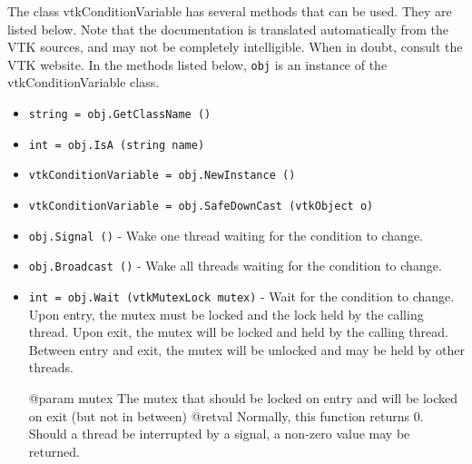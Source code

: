 The class vtkConditionVariable has several methods that can be used.
  They are listed below.
Note that the documentation is translated automatically from the VTK sources,
and may not be completely intelligible.  When in doubt, consult the VTK website.
In the methods listed below, \verb|obj| is an instance of the vtkConditionVariable class.
\begin{itemize}
\item  \verb|string = obj.GetClassName ()|

\item  \verb|int = obj.IsA (string name)|

\item  \verb|vtkConditionVariable = obj.NewInstance ()|

\item  \verb|vtkConditionVariable = obj.SafeDownCast (vtkObject o)|

\item  \verb|obj.Signal ()| -  Wake one thread waiting for the condition to change.

\item  \verb|obj.Broadcast ()| -  Wake all threads waiting for the condition to change.

\item  \verb|int = obj.Wait (vtkMutexLock mutex)| -  Wait for the condition to change.
 Upon entry, the mutex must be locked and the lock held by the calling thread.
 Upon exit, the mutex will be locked and held by the calling thread.
 Between entry and exit, the mutex will be unlocked and may be held by other threads.
 
 @param mutex The mutex that should be locked on entry and will be locked on exit (but not in between)
 @retval Normally, this function returns 0. Should a thread be interrupted by a signal, a non-zero value may be returned.

\end{itemize}
